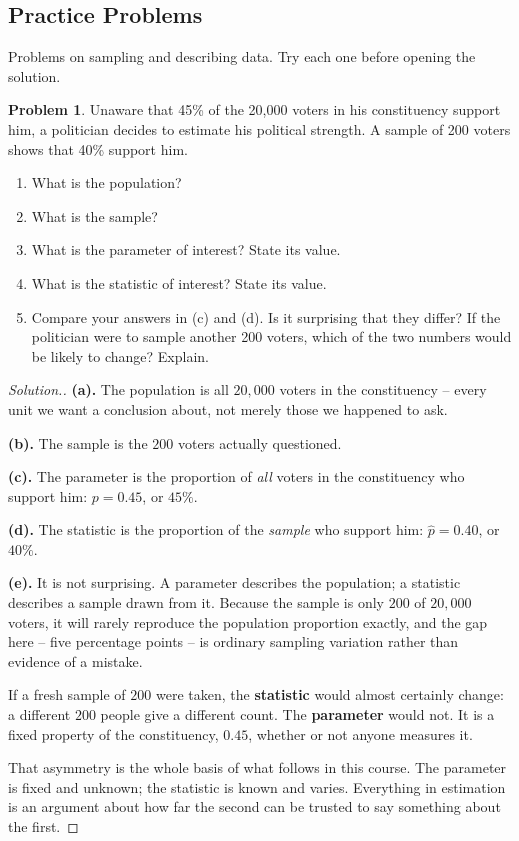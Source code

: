 \documentclass[11pt,a4paper]{article}
\theoremstyle{definition}
\newtheorem{problemx}{Problem}[section]
\newenvironment{problem}{\begin{problemx}}{\end{problemx}}
\newenvironment{solution}
  {\renewcommand{\qedsymbol}{}\begin{proof}[\textit{Solution}.]}
  {\end{proof}}
\begin{document}
\pagebreak
\subsection{Practice Problems}

Problems on sampling and describing data. Try each one before
opening the solution.

\begin{problem}
Unaware that 45\% of the 20{,}000 voters in his constituency support him, a politician
decides to estimate his political strength. A sample of 200 voters shows that 40\%
support him.
\begin{enumerate}
\item[(a).] What is the population?
\item[(b).] What is the sample?
\item[(c).] What is the parameter of interest? State its value.
\item[(d).] What is the statistic of interest? State its value.
\item[(e).] Compare your answers in (c) and (d). Is it surprising that they differ? If the
politician were to sample another 200 voters, which of the two numbers would be likely to
change? Explain.
\end{enumerate}
\end{problem}

\begin{solution}
\textbf{(a).} The population is all $20{,}000$ voters in the constituency -- every unit we
want a conclusion about, not merely those we happened to ask.

\textbf{(b).} The sample is the $200$ voters actually questioned.

\textbf{(c).} The parameter is the proportion of \emph{all} voters in the constituency who
support him: $p = 0.45$, or $45\%$.

\textbf{(d).} The statistic is the proportion of the \emph{sample} who support him:
$\hat{p} = 0.40$, or $40\%$.

\textbf{(e).} It is not surprising. A parameter describes the population; a statistic
describes a sample drawn from it. Because the sample is only $200$ of $20{,}000$ voters,
it will rarely reproduce the population proportion exactly, and the gap here -- five
percentage points -- is ordinary sampling variation rather than evidence of a mistake.

If a fresh sample of $200$ were taken, the \textbf{statistic} would almost certainly
change: a different $200$ people give a different count. The \textbf{parameter} would not.
It is a fixed property of the constituency, $0.45$, whether or not anyone measures it.

That asymmetry is the whole basis of what follows in this course. The parameter is fixed
and unknown; the statistic is known and varies. Everything in estimation is an argument
about how far the second can be trusted to say something about the first.
\end{solution}
\end{document}
